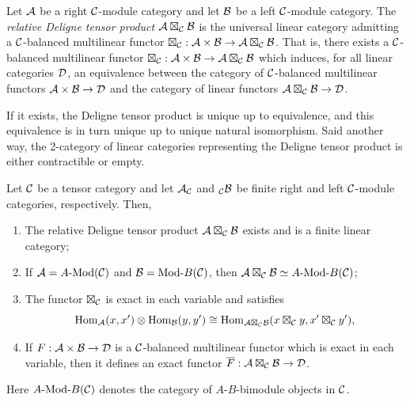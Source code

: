 \documentclass{amsart}
\begin{document}
\begin{definition}
	Let $\mathcal A$ be a right $\mathcal C$-module category and let $\mathcal B$ be a left $\mathcal C$-module category. The {\em relative Deligne tensor product $\mathcal A \boxtimes_{\mathcal C} \mathcal B$} is the universal linear category admitting a $\mathcal C$-balanced multilinear functor $\boxtimes_{\mathcal C}: \mathcal A \times \mathcal B \to \mathcal A \boxtimes_{\mathcal C} \mathcal B$. That is, there exists a $\mathcal C$-balanced multilinear functor $\boxtimes_{\mathcal C}: \mathcal A \times \mathcal B \to \mathcal A \boxtimes_{\mathcal C} \mathcal B$ which induces, for all linear categories $\mathcal D$, an equivalence between the category of $\mathcal C$-balanced multilinear functors $\mathcal A \times \mathcal B \to \mathcal D$ and the category of linear functors $\mathcal A \boxtimes_{\mathcal C} \mathcal B \to \mathcal D$. 
\end{definition}

If it exists, the Deligne tensor product is unique up to equivalence, and this equivalence is in turn unique up to unique natural isomorphism. Said another way, the 2-category of linear categories representing the Deligne tensor product is either contractible or empty. 

\begin{maintheorem} \label{thm:DelignePrdtOverATCExists}
	Let $\mathcal C$ be a tensor category and let $\mathcal A_{\mathcal C}$ and ${}_{\mathcal C}\mathcal B$ be finite right and left $\mathcal C$-module categories, respectively. Then,
	\begin{enumerate}
		\item The relative Deligne tensor product $\mathcal A \boxtimes_{\mathcal C} \mathcal B$ exists and is a finite linear category;
		\item If $\cA = \Mod{A}{}(\cC)$ and $\cB = \Mod{}{B}(\cC)$, then $\cA \boxtimes_{\cC} \cB \simeq \Mod{A }{B}(\cC)$;

		\item The functor $\boxtimes_{\mathcal C}$ is exact in each variable and satisfies 
		\begin{equation*}
			\operatorname{Hom}_{\mathcal A}(x,x') \otimes \operatorname{Hom}_{\mathcal B}(y, y') \cong \operatorname{Hom}_{\mathcal A \boxtimes_{\mathcal C} \mathcal B} (x \boxtimes_{\mathcal C} y, x' \boxtimes_{\mathcal C} y'),
		\end{equation*}
		\item If $F: \mathcal A \times \mathcal B \to \mathcal D$ is a $\mathcal C$-balanced multilinear functor which is exact in each variable, then it defines an exact functor $\overline{F}: \mathcal A \boxtimes_{\mathcal C} \mathcal B \to \mathcal D$. 
	\end{enumerate} 
\nid Here $\Mod{A}{B}(\cC)$ denotes the category of $A$-$B$-bimodule objects in $\mathcal C$.	
\end{maintheorem}
\end{document}
